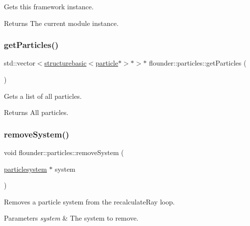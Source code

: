 Gets this framework instance. 

\begin{DoxyReturn}{Returns}
The current module instance. 
\end{DoxyReturn}
\mbox{\label{classflounder_1_1particles_a73468a12149371a445e01fa178684aa0}} 
\subsubsection{\texorpdfstring{get\+Particles()}{getParticles()}}
{\footnotesize\ttfamily std\+::vector$<$\hyperlink{classflounder_1_1structurebasic}{structurebasic}$<$\hyperlink{classflounder_1_1particle}{particle}$\ast$$>$$\ast$$>$$\ast$ flounder\+::particles\+::get\+Particles (\begin{DoxyParamCaption}{ }\end{DoxyParamCaption})\hspace{0.3cm}{\ttfamily [inline]}}



Gets a list of all particles. 

\begin{DoxyReturn}{Returns}
All particles. 
\end{DoxyReturn}
\mbox{\label{classflounder_1_1particles_a33af75a6466ece3ab1b661bcdffae201}} 
\subsubsection{\texorpdfstring{remove\+System()}{removeSystem()}}
{\footnotesize\ttfamily void flounder\+::particles\+::remove\+System (\begin{DoxyParamCaption}\item[{\hyperlink{classflounder_1_1particlesystem}{particlesystem} $\ast$}]{system }\end{DoxyParamCaption})}



Removes a particle system from the recalculate\+Ray loop. 


\begin{DoxyParams}{Parameters}
{\em system} & The system to remove. \\
\hline
\end{DoxyParams}
\mbox{\label{classflounder_1_1particles_a12f1dd9883cc49987f6ff0ca3105bdb6}} 
